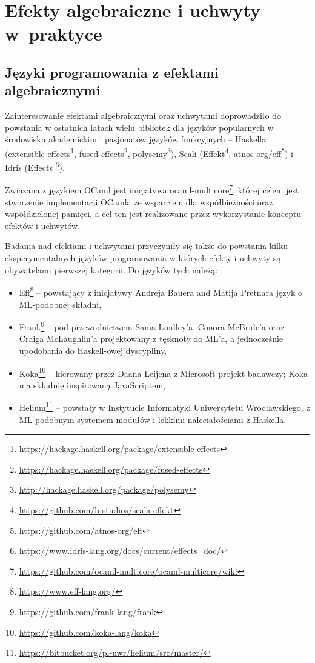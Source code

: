 
\chapter{Efekty algebraiczne i uchwyty w~praktyce}

\section{Języki programowania z efektami algebraicznymi}

Zainteresowanie efektami algebraicznymi oraz uchwytami doprowadziło do powstania w ostatnich latach wielu bibliotek dla języków popularnych w środowisku akademickim i pasjonatów języków funkcyjnych -- Haskella (extensible-effects\footnote{\url{https://hackage.haskell.org/package/extensible-effects}},
fused-effects\footnote{\url{https://hackage.haskell.org/package/fused-effects}},
polysemy\footnote{\url{http://hackage.haskell.org/package/polysemy}}), Scali
(Effekt\footnote{\url{https://github.com/b-studios/scala-effekt}},
atnos-org/eff\footnote{\url{https://github.com/atnos-org/eff}})
i Idris (Effects \footnote{\url{https://www.idris-lang.org/docs/current/effects_doc/}}).

Związana z językiem OCaml jest inicjatywa ocaml-multicore\footnote{\url{https://github.com/ocaml-multicore/ocaml-multicore/wiki}}, której celem jest stworzenie implementacji OCamla ze wsparciem dla współbieżności oraz współdzielonej pamięci, a cel ten jest realizowane przez wykorzystanie konceptu efektów i uchwytów.

Badania nad efektami i uchwytami przyczyniły się także do powstania kilku eksperymentalnych języków programowania w których efekty i uchwyty są obywatelami pierwszej kategorii. Do języków tych należą:
\begin{itemize}
\item Eff\footnote{\url{https://www.eff-lang.org/}} -- powstający z inicjatywy Andreja Bauera and Matija Pretnara język o ML-podobnej składni,
\item Frank\footnote{\url{https://github.com/frank-lang/frank}} \cite{DBLP:journals/corr/LindleyMM16} -- pod przewodnictwem Sama Lindley'a, Conora McBride'a oraz Craiga McLaughlin'a projektowany z tęsknoty do ML'a, a jednocześnie upodobania do Haskell-owej dyscypliny,
\item Koka\footnote{\url{https://github.com/koka-lang/koka}} -- kierowany przez Daana Leijena z Microsoft projekt badawczy; Koka ma składnię inspirowaną JavaScriptem,
\item Helium\footnote{\url{https://bitbucket.org/pl-uwr/helium/src/master/}} \cite{biernacki2019abstracting} -- powstały w Instytucie Informatyki Uniwersytetu Wrocławskiego, z ML-podobnym systemem modułów i lekkimi naleciałościami z Haskella.
\end{itemize}

